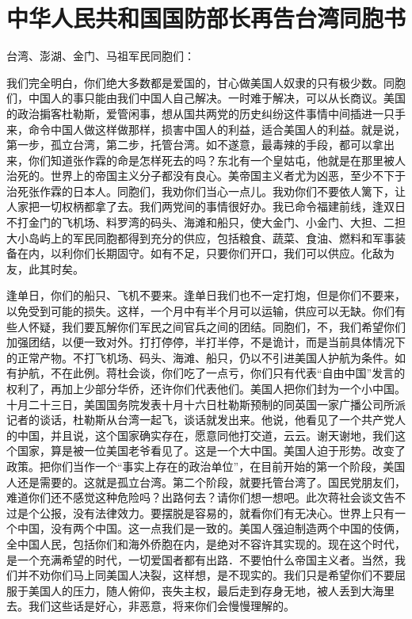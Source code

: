\section[中华人民共和国国防部长再告台湾同胞书（一九五八年十月二十五日）]{中华人民共和国国防部长再告台湾同胞书}


台湾、澎湖、金门、马祖军民同胞们：

我们完全明白，你们绝大多数都是爱国的，甘心做美国人奴隶的只有极少数。同胞们，中国人的事只能由我们中国人自己解决。一时难于解决，可以从长商议。美国的政治掮客杜勒斯，爱管闲事，想从国共两党的历史纠纷这件事情中间插进一只手来，命令中国人做这样做那样，损害中国人的利益，适合美国人的利益。就是说，第一步，孤立台湾，第二步，托管台湾。如不遂意，最毒辣的手段，都可以拿出来，你们知道张作霖的命是怎样死去的吗？东北有一个皇姑屯，他就是在那里被人治死的。世界上的帝国主义分子都没有良心。美帝国主义者尤为凶恶，至少不下于治死张作霖的日本人。同胞们，我劝你们当心一点儿。我劝你们不要依人篱下，让人家把一切权柄都拿了去。我们两党间的事情很好办。我已命令福建前线，逢双日不打金门的飞机场、料罗湾的码头、海滩和船只，使大金门、小金门、大担、二担大小岛屿上的军民同胞都得到充分的供应，包括粮食、蔬菜、食油、燃料和军事装备在内，以利你们长期固守。如有不足，只要你们开口，我们可以供应。化敌为友，此其时矣。

逢单日，你们的船只、飞机不要来。逢单日我们也不一定打炮，但是你们不要来，以免受到可能的损失。这样，一个月中有半个月可以运输，供应可以无缺。你们有些人怀疑，我们要瓦解你们军民之间官兵之间的团结。同胞们，不，我们希望你们加强团结，以便一致对外。打打停停，半打半停，不是诡计，而是当前具体情况下的正常产物。不打飞机场、码头、海滩、船只，仍以不引进美国人护航为条件。如有护航，不在此例。蒋杜会谈，你们吃了一点亏，你们只有代表“自由中国”发言的权利了，再加上少部分华侨，还许你们代表他们。美国人把你们封为一个小中国。十月二十三日，美国国务院发表十月十六日杜勒斯预制的同英国一家广播公司所派记者的谈话，杜勒斯从台湾一起飞，谈话就发出来。他说，他看见了一个共产党人的中国，并且说，这个国家确实存在，愿意同他打交道，云云。谢天谢地，我们这个国家，算是被一位美国老爷看见了。这是一个大中国。美国人迫于形势。改变了政策。把你们当作一个“事实上存在的政治单位”，在目前开始的第一个阶段，美国人还是需要的。这就是孤立台湾。第二个阶段，就要托管台湾了。国民党朋友们，难道你们还不感觉这种危险吗？出路何去？请你们想一想吧。此次蒋社会谈文告不过是个公报，没有法律效力。要摆脱是容易的，就看你们有无决心。世界上只有一个中国，没有两个中国。这一点我们是一致的。美国人强迫制造两个中国的伎俩，全中国人民，包括你们和海外侨胞在内，是绝对不容许其实现的。现在这个时代，是一个充满希望的时代，一切爱国者都有出路．不要怕什么帝国主义者。当然，我们并不劝你们马上同美国人决裂，这样想，是不现实的。我们只是希望你们不要屈服于美国人的压力，随人俯仰，丧失主权，最后走到存身无地，被人丢到大海里去。我们这些话是好心，非恶意，将来你们会慢慢理解的。


